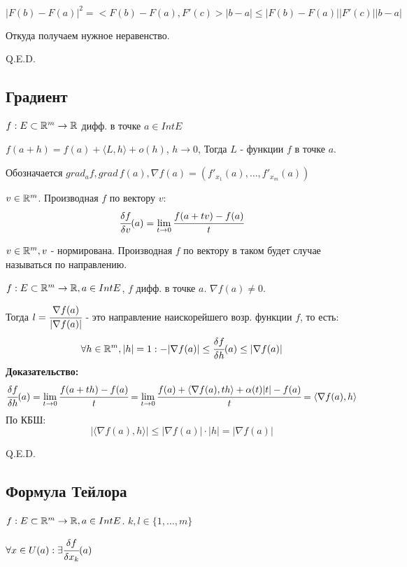 $|F(b) - F(a) |^2 = <F(b)-F(a), F'(c)>|b-a| \leq |F(b)-F(a)| |F'(c)||b-a|$

Откуда получаем нужное неравенство.

\hfill Q.E.D.

\pagebreak
\subsection{Градиент}

 $f: E \subset \mathbb{R}^m \rightarrow \mathbb{R}$ дифф. в точке $a\in Int E$

$f(a+h) = f(a) + \langle L,h\rangle + o(h)$, $h\rightarrow 0 $, Тогда $L$ -  функции $f$ в точке $a$.


Обозначается $grad_af, grad \,f(a), \nabla f(a)= (f'_{x_1}(a),\ldots , f'_{x_m}(a))$ 

 $v\in \mathbb{R}^m$. Производная $f$ по вектору $v$:
$$\cfrac{\delta f}{\delta v}(a) = \lim\limits_{t\rightarrow 0}\cfrac{f(a+tv)-f(a)}{t}$$

 $v\in \mathbb{R}^m, v$ - нормирована. Производная $f$ по вектору в таком будет случае называться по направлению.


$f : E \subset\mathbb{R}^m \rightarrow \mathbb{R} , a \in Int E$, $f$ дифф. в точке $a$. $\nabla f(a) \neq 0$.

Тогда $l = \cfrac{\nabla f(a)}{|\nabla f(a)|}$ - это направление наискорейшего возр. функции $f$, то есть:
$$\forall h\in \mathbb{R}^m, |h| =1: -|\nabla f(a)|\leq\cfrac{\delta f}{\delta h}(a) \leq |\nabla f(a)|$$
\textbf{Доказательство:}
$$\cfrac{\delta f}{\delta h}(a) = \lim\limits_{t\rightarrow0} \cfrac{f(a+th) - f(a)}{t} = \lim\limits_{t\rightarrow0}\cfrac{f(a) + \langle \nabla f(a), th \rangle +\alpha(t)|t| - f(a)}{t} = \langle \nabla f(a),h \rangle$$
По КБШ:
$$|\langle \nabla f(a), h\rangle|\leq |\nabla f(a)| \cdot |h|=|\nabla f(a)|$$

\hfill Q.E.D.

\pagebreak 

\subsection{Формула Тейлора}

 $f: E \subset \mathbb{R}^m \rightarrow \mathbb{R}, a \in Int E$. $k,l \in \{1,\ldots, m\}$

$\forall x \in U(a): \exists \cfrac{\delta f}{\delta x_k}(a)$

